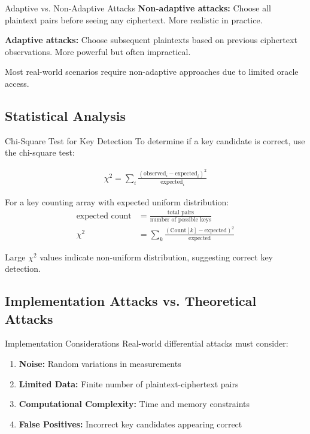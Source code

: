 \documentclass[12pt,a4paper]{article}
\theoremstyle{definition}
\begin{document}
\begin{warningbox}{Adaptive vs. Non-Adaptive Attacks}
\textbf{Non-adaptive attacks:} Choose all plaintext pairs before seeing any ciphertext. More realistic in practice.

\textbf{Adaptive attacks:} Choose subsequent plaintexts based on previous ciphertext observations. More powerful but often impractical.

Most real-world scenarios require non-adaptive approaches due to limited oracle access.
\end{warningbox}

\subsection{Statistical Analysis}

\begin{examplebox}{Chi-Square Test for Key Detection}
To determine if a key candidate is correct, use the chi-square test:

\begin{align}
\chi^2 = \sum_{i} \frac{(\text{observed}_i - \text{expected}_i)^2}{\text{expected}_i}
\end{align}

For a key counting array with expected uniform distribution:
\begin{align}
\text{expected count} &= \frac{\text{total pairs}}{\text{number of possible keys}} \\
\chi^2 &= \sum_{k} \frac{(\text{Count}[k] - \text{expected})^2}{\text{expected}}
\end{align}

Large $\chi^2$ values indicate non-uniform distribution, suggesting correct key detection.
\end{examplebox}

\subsection{Implementation Attacks vs. Theoretical Attacks}

\begin{definitionbox}{Implementation Considerations}
Real-world differential attacks must consider:

\begin{enumerate}
    \item \textbf{Noise:} Random variations in measurements
    \item \textbf{Limited Data:} Finite number of plaintext-ciphertext pairs
    \item \textbf{Computational Complexity:} Time and memory constraints
    \item \textbf{False Positives:} Incorrect key candidates appearing correct
\end{enumerate}
\end{definitionbox}
\end{document}
